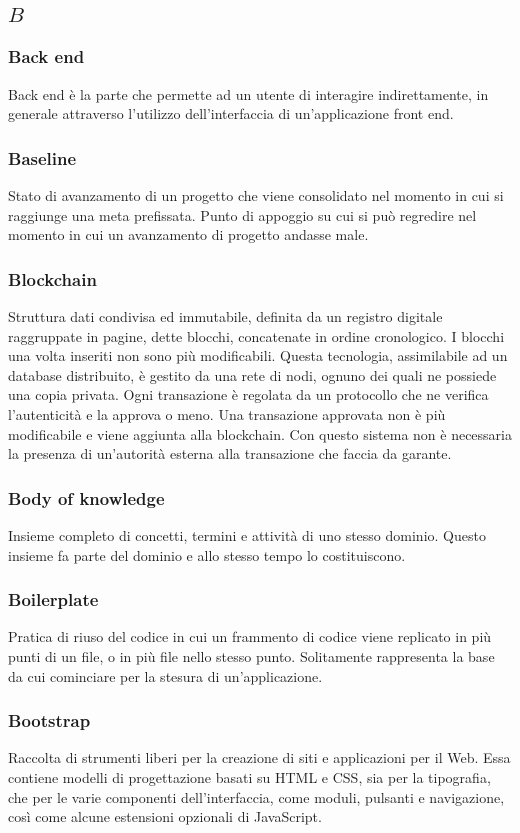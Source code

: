 \subsection*{\quad$B\quad$}
\subsubsection*{Back end}
Back end è la parte che permette ad un utente di interagire indirettamente, in generale attraverso l’utilizzo dell’interfaccia di un’applicazione front end.

\subsubsection*{Baseline}
Stato di avanzamento di un progetto che viene consolidato nel momento in cui si raggiunge una meta prefissata. Punto di appoggio su cui si può regredire nel momento in cui un avanzamento di progetto andasse male.

\subsubsection*{Blockchain}
Struttura dati condivisa ed immutabile, definita da un registro digitale raggruppate in pagine, dette blocchi, concatenate in ordine cronologico. I blocchi una volta inseriti non sono più modificabili. Questa tecnologia, assimilabile ad un database distribuito, è gestito da una rete di nodi, ognuno dei quali ne possiede una copia privata. Ogni transazione è regolata da un protocollo che
ne verifica l’autenticità e la approva o meno. Una transazione approvata non è più modificabile e viene aggiunta alla blockchain. Con questo sistema non è necessaria la presenza di un’autorità esterna alla transazione che faccia da garante.

\subsubsection*{Body of knowledge}
Insieme completo di concetti, termini e attività di uno stesso dominio. Questo insieme fa parte del dominio e allo stesso tempo lo costituiscono.

\subsubsection*{Boilerplate}
Pratica di riuso del codice in cui un frammento di codice viene replicato in più punti di un file, o in più file nello stesso punto. Solitamente rappresenta la base da cui cominciare per la stesura di un'applicazione.

\subsubsection*{Bootstrap}
Raccolta di strumenti liberi per la creazione di siti e applicazioni per il Web. Essa contiene modelli di progettazione basati su HTML e CSS, sia per la tipografia, che per le varie componenti dell'interfaccia, come moduli, pulsanti e navigazione, così come alcune estensioni opzionali di JavaScript.
